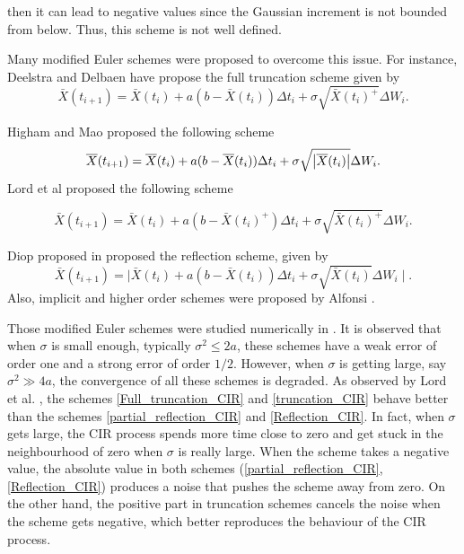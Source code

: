 \documentclass[11pt]{article}
\begin{document}
then it can lead to negative values since the Gaussian
increment is not bounded from below. Thus, this  scheme is not well defined.

Many modified Euler schemes were proposed to overcome this issue. For instance, Deelstra and Delbaen \cite{deelstra1998convergence} have propose the full truncation scheme given by
\begin{equation}\label{Full_truncation_CIR}
\bar{X}(t_{i+1})=\bar{X}(t_i)+a(b-\bar{X}(t_i)) \Delta t_i+\sigma \sqrt{\bar{X}(t_i)^+} \Delta W_i.
\end{equation}

Higham and Mao \cite{mao2007stochastic} proposed the following scheme
 \begin{equation}\label{partial_reflection_CIR}
 \overline{X}(t_{i+1})=\overline{X}(t_i)+a(b-\overline{X}(t_i)) \Delta t_i+\sigma \sqrt{\left\lvert\overline{X}(t_i)\right\rvert} \Delta W_i.
 \end{equation}
 Lord et al \cite{lord2010comparison} proposed the following scheme
 
 \begin{equation}\label{truncation_CIR}
 \bar{X}(t_{i+1})=\bar{X}(t_i)+a(b-\bar{X}(t_i)^+) \Delta t_i+\sigma \sqrt{\bar{X}(t_i)^+} \Delta W_i.
 \end{equation}
 
 
Diop proposed in \cite{berkaoui2008euler} proposed the reflection scheme, given by
\begin{equation}\label{Reflection_CIR}
\bar{X}(t_{i+1})=\mid\bar{X}(t_i)+a(b-\bar{X}(t_i)) \Delta t_i+\sigma \sqrt{\bar{X}(t_i)} \Delta W_i \mid.
\end{equation}
Also, implicit and higher order schemes were proposed by Alfonsi \cite{alfonsi2005discretization,alfonsi2008second,alfonsi2010high}.

Those modified Euler schemes were studied  numerically in \cite{alfonsi2005discretization}. It is observed that when $\sigma$ is small enough, typically $\sigma^2 \le 2a$, these schemes have a weak error of order one and a strong error of order $1/2$. However, when $\sigma$ is getting large, say $\sigma^2\gg 4a$, the convergence of all these schemes is degraded. As observed
by Lord et al. \cite{lord2010comparison}, the schemes \eqref{Full_truncation_CIR} and \eqref{truncation_CIR} behave better than the schemes \eqref{partial_reflection_CIR} and \eqref{Reflection_CIR}. In fact, when $\sigma$ gets large, the CIR process spends more time close to zero and get stuck in the neighbourhood of zero when $\sigma$ is really large. When the scheme takes a negative value, the absolute value in  both schemes (\eqref{partial_reflection_CIR},\eqref{Reflection_CIR}) produces a noise that pushes the scheme away from zero. On the other hand, the positive part in truncation schemes cancels the noise when the scheme gets negative, which better reproduces the behaviour of the
CIR process. 
\end{document}
